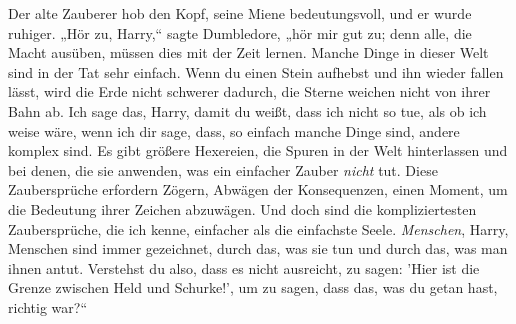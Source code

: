 Der alte Zauberer hob den Kopf, seine Miene bedeutungsvoll, und er wurde ruhiger. „Hör zu, Harry,“ sagte Dumbledore, „hör mir gut zu; denn alle, die Macht ausüben, müssen dies mit der Zeit lernen. Manche Dinge in dieser Welt sind in der Tat sehr einfach. Wenn du einen Stein aufhebst und ihn wieder fallen lässt, wird die Erde nicht schwerer dadurch, die Sterne weichen nicht von ihrer Bahn ab. Ich sage das, Harry, damit du weißt, dass ich nicht so tue, als ob ich weise wäre, wenn ich dir sage, dass, so einfach manche Dinge sind, andere komplex sind. Es gibt größere Hexereien, die Spuren in der Welt hinterlassen und bei denen, die sie anwenden, was ein einfacher Zauber \emph{nicht} tut. Diese Zaubersprüche erfordern Zögern, Abwägen der Konsequenzen, einen Moment, um die Bedeutung ihrer Zeichen abzuwägen. Und doch sind die kompliziertesten Zaubersprüche, die ich kenne, einfacher als die einfachste Seele. \emph{Menschen}, Harry, Menschen sind immer gezeichnet, durch das, was sie tun und durch das, was man ihnen antut. Verstehst du also, dass es nicht ausreicht, zu sagen: 'Hier ist die Grenze zwischen Held und Schurke!', um zu sagen, dass das, was du getan hast, richtig war?“

